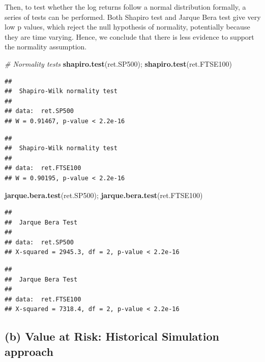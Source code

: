 \documentclass[]{article}
\newenvironment{Shaded}{\begin{snugshade}}{\end{snugshade}}
\newcommand{\CommentTok}[1]{\textcolor[rgb]{0.56,0.35,0.01}{\textit{#1}}}
\newcommand{\KeywordTok}[1]{\textcolor[rgb]{0.13,0.29,0.53}{\textbf{#1}}}
\newcommand{\NormalTok}[1]{#1}
\begin{document}
Then, to test whether the log returns follow a normal distribution
formally, a series of tests can be performed. Both Shapiro test and
Jarque Bera test give very low p values, which reject the null
hypothesis of normality, potentially because they are time varying.
Hence, we conclude that there is less evidence to support the normality
assumption.

\newpage

\begin{Shaded}
\begin{Highlighting}[]
\CommentTok{# Normality tests}
\KeywordTok{shapiro.test}\NormalTok{(ret.SP500); }\KeywordTok{shapiro.test}\NormalTok{(ret.FTSE100)}
\end{Highlighting}
\end{Shaded}

\begin{verbatim}
## 
##  Shapiro-Wilk normality test
## 
## data:  ret.SP500
## W = 0.91467, p-value < 2.2e-16
\end{verbatim}

\begin{verbatim}
## 
##  Shapiro-Wilk normality test
## 
## data:  ret.FTSE100
## W = 0.90195, p-value < 2.2e-16
\end{verbatim}

\begin{Shaded}
\begin{Highlighting}[]
\KeywordTok{jarque.bera.test}\NormalTok{(ret.SP500); }\KeywordTok{jarque.bera.test}\NormalTok{(ret.FTSE100)}
\end{Highlighting}
\end{Shaded}

\begin{verbatim}
## 
##  Jarque Bera Test
## 
## data:  ret.SP500
## X-squared = 2945.3, df = 2, p-value < 2.2e-16
\end{verbatim}

\begin{verbatim}
## 
##  Jarque Bera Test
## 
## data:  ret.FTSE100
## X-squared = 7318.4, df = 2, p-value < 2.2e-16
\end{verbatim}

\hypertarget{b-value-at-risk-historical-simulation-approach}{%
\subsection{(b) Value at Risk: Historical Simulation
approach}\label{b-value-at-risk-historical-simulation-approach}}
\end{document}

